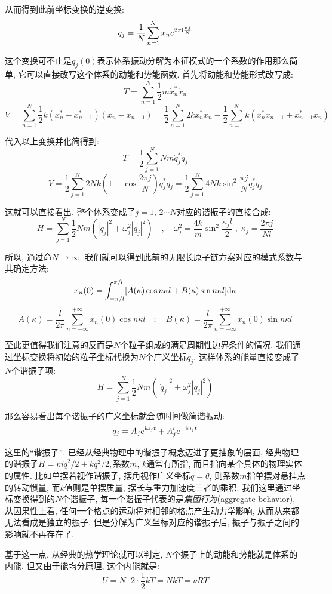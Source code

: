 从而得到此前坐标变换的逆变换:
\[q_j=\frac{1}{N}\sum_{n=1}^N x_n e^{2\pi{\rm i}\frac{nj}{N}}\]

这个变换可不止是$q_j(0)$表示体系振动分解为本征模式的一个系数的作用那么简单, 它可以直接改写这个体系的动能和势能函数. 首先将动能和势能形式改写成:
\[T=\sum_{n=1}^N \frac{1}{2}m\dot{x}_n^*\dot{x}_n\]
\[V=\sum_{n=1}^N \frac{1}{2}k(x_n^*-x_{n-1}^*)(x_n-x_{n-1})=\frac{1}{2}\sum_{n=1}^N 2k {x}_n^* {x}_n-\frac{1}{2}\sum_{n=1}^N k (x_n^* x_{n-1}+x_{n-1}^* x_{n})\]

代入以上变换并化简得到:
\[T=\frac{1}{2}\sum_{j=1}^N Nm\dot{q}_j^*\dot{q}_j\]
\[V=\frac{1}{2}\sum_{j=1}^N 2Nk\left(1-\cos\frac{2\pi j}{N}\right) {q}_j^* {q}_j=\frac{1}{2}\sum_{j=1}^N 4Nk\sin^2\frac{\pi j}{N} {q}_j^* {q}_j\]

这就可以直接看出. 整个体系变成了$j=1,\,2\cdots N$对应的谐振子的直接合成:
\[H=\sum_{j=1}^N  \frac{1}{2}Nm(|\dot{q}_j|^2+\omega_j^2 |q_j|^2) \quad,\quad \omega_j^2=\frac{4k}{m}\sin^2 \frac{\kappa_j l}{2}\;,\;\kappa_j=\frac{2\pi j}{Nl}\]

所以, 通过命$N\to \infty$. 我们就可以得到此前的无限长原子链方案对应的模式系数与其确定方法:
\[x_n(0)=\int_{-\pi/l}^{\pi/l} [A(\kappa)\cos n\kappa l+B(\kappa)\sin n\kappa l]\textrm{d} \kappa\]
\[A(\kappa)=\frac{l}{2\pi}\sum_{n=-\infty}^{+\infty}x_n(0)\cos n\kappa l\quad ;\quad B(\kappa)=\frac{l}{2\pi}\sum_{n=-\infty}^{+\infty}x_n(0)\sin n\kappa l\]

至此更值得我们注意的反而是$N$个粒子组成的满足周期性边界条件的情况. 我们通过坐标变换将初始的粒子坐标代换为$N$个广义坐标$q_j$. 这样体系的能量直接变成了$N$个谐振子项:
\[H=\sum_{j=1}^N  \frac{1}{2}Nm(|\dot{q}_j|^2+\omega_j^2 |q_j|^2)\]

那么容易看出每个谐振子的广义坐标就会随时间做简谐振动:
\[q_j=A_j e^{{\rm i} \omega_j t}+A_j' e^{-{\rm i} \omega_j t}\]

这里的``谐振子'', 已经从经典物理中的谐振子概念迈进了更抽象的层面. 经典物理的谐振子$H=m\dot{q}^2/2+kq^2/2$,\,系数$m,\,k$通常有所指, 而且指向某个具体的物理实体的属性. 比如单摆若视作谐振子, 摆角视作广义坐标$q=\theta$, 则系数$m$指单摆对悬挂点的转动惯量, 而$k$值则是单摆质量, 摆长与重力加速度三者的乘积. 我们这里通过坐标变换得到的$N$个谐振子, 每一个谐振子代表的是\emph{集团行为}(aggregate behavior), 从因果性上看, 任何一个格点的运动将对相邻的格点产生动力学影响, 从而从来都无法看成是独立的振子. 但是分解为广义坐标对应的谐振子后, 振子与振子之间的影响就不再存在了.

基于这一点, 从经典的热学理论就可以判定, $N$个振子上的动能和势能就是体系的内能. 但又由于能均分原理, 这个内能就是:
\[U=N\cdot 2\cdot\frac{1}{2}kT=NkT=\nu RT\]

